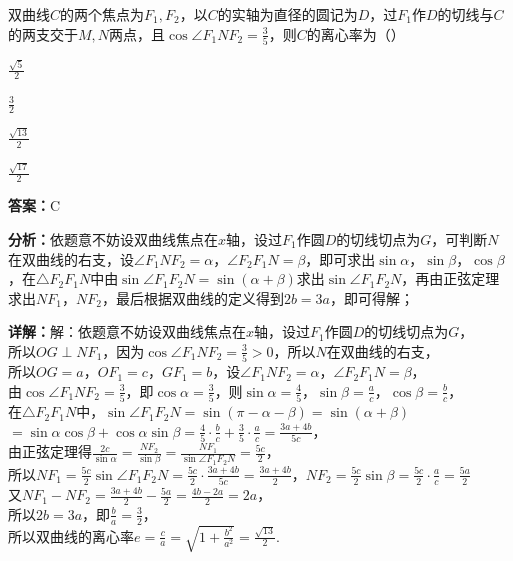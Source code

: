 \begin{question}[points=5]
双曲线$C$的两个焦点为$F_1, F_2$，以$C$的实轴为直径的圆记为$D$，过$F_1$作$D$的切线与$C$的两支交于$M, N$两点，且$\cos\angle F_1NF_2 = \frac{3}{5}$，则$C$的离心率为（\qquad）
\begin{choices}
  \item $\frac{\sqrt{5}}{2}$
  \item $\frac{3}{2}$
  \item $\frac{\sqrt{13}}{2}$
  \item $\frac{\sqrt{17}}{2}$
\end{choices}
\begin{solution}
\textbf{答案：}C

\textbf{分析：}依题意不妨设双曲线焦点在$x$轴，设过$F_1$作圆$D$的切线切点为$G$，可判断$N$在双曲线的右支，设$\angle F_1NF_2 = \alpha$，$\angle F_2F_1N = \beta$，即可求出$\sin\alpha$，$\sin\beta$，$\cos\beta$，在$\triangle F_2F_1N$中由$\sin\angle F_1F_2N = \sin(\alpha+\beta)$求出$\sin\angle F_1F_2N$，再由正弦定理求出$NF_1$，$NF_2$，最后根据双曲线的定义得到$2b=3a$，即可得解；

\textbf{详解：}解：依题意不妨设双曲线焦点在$x$轴，设过$F_1$作圆$D$的切线切点为$G$，\\所以$OG \perp NF_1$，因为$\cos\angle F_1NF_2 = \frac{3}{5} > 0$，所以$N$在双曲线的右支，\\所以$OG = a$，$OF_1 = c$，$GF_1 = b$，设$\angle F_1NF_2 = \alpha$，$\angle F_2F_1N = \beta$，\\由$\cos\angle F_1NF_2 = \frac{3}{5}$，即$\cos\alpha = \frac{3}{5}$，则$\sin\alpha = \frac{4}{5}$，$\sin\beta = \frac{a}{c}$，$\cos\beta = \frac{b}{c}$，\\在$\triangle F_2F_1N$中，$\sin\angle F_1F_2N = \sin(\pi-\alpha-\beta) = \sin(\alpha+\beta)$\\$= \sin\alpha\cos\beta + \cos\alpha\sin\beta = \frac{4}{5}\cdot\frac{b}{c} + \frac{3}{5}\cdot\frac{a}{c} = \frac{3a+4b}{5c}$，\\由正弦定理得$\frac{2c}{\sin\alpha} = \frac{NF_2}{\sin\beta} = \frac{NF_1}{\sin\angle F_1F_2N} = \frac{5c}{2}$，\\所以$NF_1 = \frac{5c}{2}\sin\angle F_1F_2N = \frac{5c}{2}\cdot\frac{3a+4b}{5c} = \frac{3a+4b}{2}$，$NF_2 = \frac{5c}{2}\sin\beta = \frac{5c}{2}\cdot\frac{a}{c} = \frac{5a}{2}$\\又$NF_1 - NF_2 = \frac{3a+4b}{2} - \frac{5a}{2} = \frac{4b-2a}{2} = 2a$，\\所以$2b = 3a$，即$\frac{b}{a} = \frac{3}{2}$，\\所以双曲线的离心率$e = \frac{c}{a} = \sqrt{1+\frac{b^2}{a^2}} = \frac{\sqrt{13}}{2}$.
\end{solution}
\end{question}

